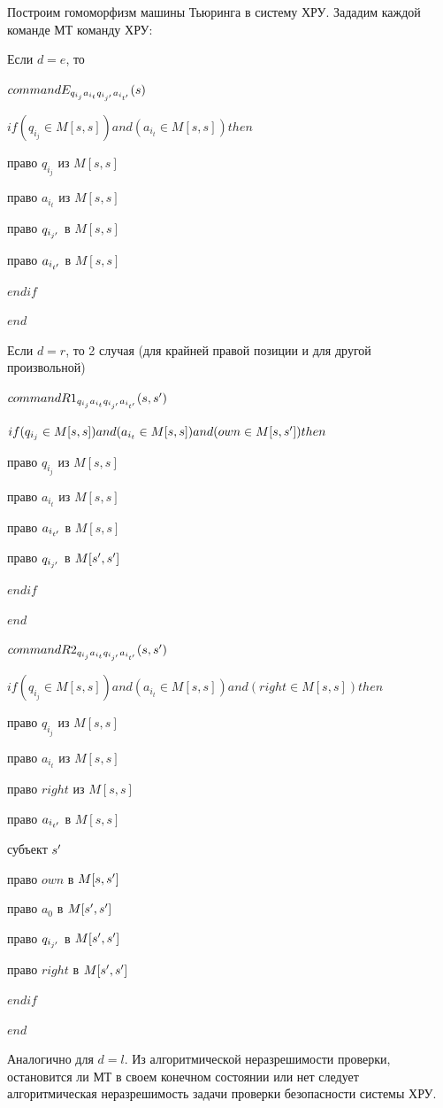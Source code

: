 \begin{proofs}
\begin{dokvo}
		Построим гомоморфизм машины Тьюринга в систему ХРУ. Зададим каждой команде МТ команду ХРУ:

		Если $d = e$, то

		$command E_{q_{i_{j}}a_{i_{t}}q_{i_{j^{\prime}}}a_{i_{t^{\prime}}}}(s)$

		$if (q_{i_{j}} \in M[s,s]) and (a_{i_{t}} \in M[s,s]) then $

		 право $q_{i_{j}}$ из $M[s,s]$

		 право $a_{i_{t}}$ из $M[s,s]$

		 право $q_{i_{j^{\prime}}}$ в $M[s,s]$

		 право $a_{i_{t^{\prime}}}$ в $M[s,s]$

		$endif$

		$end$

		Если $d = r$, то 2 случая (для крайней правой позиции и для другой произвольной)

		$command R1_{q_{i_{j}}a_{i_{t}}q_{i_{j^{\prime}}}a_{i_{t^{\prime}}}}(s, s^{\prime})$

		$if (q_{i_{j}} \in M[s,s]) and (a_{i_{t}} \in M[s,s])and (own \in M[s,s^{\prime}]) then $

		 право $q_{i_{j}}$ из $M[s,s]$

		 право $a_{i_{t}}$ из $M[s,s]$

		 право $a_{i_{t^{\prime}}}$ в $M[s,s]$

		 право $q_{i_{j^{\prime}}}$ в $M[s^{\prime},s^{\prime}]$

		$endif$

		$end$

		$command R2_{q_{i_{j}}a_{i_{t}}q_{i_{j^{\prime}}}a_{i_{t^{\prime}}}}(s, s^{\prime})$

		$if (q_{i_{j}} \in M[s,s]) and (a_{i_{t}} \in M[s,s])and (right \in M[s,s]) then $

		 право $q_{i_{j}}$ из $M[s,s]$

		 право $a_{i_{t}}$ из $M[s,s]$

		 право $right$ из $M[s,s]$

		 право $a_{i_{t^{\prime}}}$ в $M[s,s]$

		 субъект $s^{\prime}$

		 право $own$ в $M[s,s^{\prime}]$

		 право $a_0$ в $M[s^{\prime},s^{\prime}]$

		 право $q_{i_{j^{\prime}}}$ в $M[s^{\prime},s^{\prime}]$

		 право $right$ в $M[s^{\prime},s^{\prime}]$

		$endif$

		$end$

		Аналогично для $d = l$. Из алгоритмической неразрешимости проверки, остановится ли МТ в своем конечном состоянии или нет следует
		алгоритмическая неразрешимость задачи проверки безопасности системы ХРУ.
	\end{dokvo}
\end{proofs}
